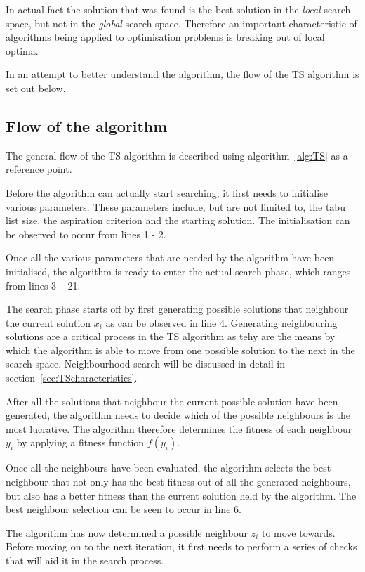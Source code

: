 In actual fact the solution that was found is the best solution in the \emph{local} search space, but not in the \emph{global} search space\cite{CompuIntelligenceIntro,AIModernApproach}. Therefore an important characteristic of algorithms being applied to optimisation problems is breaking out of local optima\cite{CompuIntelligenceIntro,AIModernApproach}.

In an attempt to better understand the algorithm, the flow of the TS algorithm is set out below.
\subsection{Flow of the algorithm}
The general flow of the TS algorithm is described using algorithm~\ref{alg:TS} as a reference point.

Before the algorithm can actually start searching, it first needs to initialise various parameters. These parameters include, but are not limited to, the tabu list size, the aspiration criterion and the starting solution. The initialisation can be observed to occur from lines 1 - 2.

Once all the various parameters that are needed by the algorithm have been initialised, the algorithm is ready to enter the actual search phase, which ranges from lines 3 -- 21. 

The search phase starts off by first generating possible solutions that neighbour the current solution $x_i$ as can be observed in line 4. Generating neighbouring solutions are a critical process in the TS algorithm as tehy are the means by which the algorithm is able to move from one possible solution to the next in the search space. Neighbourhood search will be discussed in detail in section~\ref{sec:TScharacteristics}.

After all the solutions that neighbour the current possible solution have been generated, the algorithm needs to decide which of the possible neighbours is the most lucrative. The algorithm therefore determines the fitness of each neighbour $y_i$ by applying a fitness function $f(y_i)$. 

Once all the neighbours have been evaluated, the algorithm selects the best neighbour that not only has the best fitness out of all the generated neighbours, but also has a better fitness than the current solution held by the algorithm. The best neighbour selection can be seen to occur in line 6.

The algorithm has now determined a possible neighbour $z_i$ to move towards. Before moving on to the next iteration, it first needs to perform a series of checks that will aid it in the search process.

